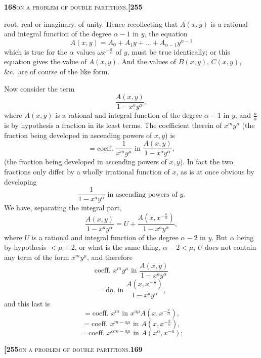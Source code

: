 \documentclass[11pt]{article}
\begin{document}
\newpage

\noindent\textbf{168}\hfill\textsc{on a problem of double partitions.}\hfill\textbf{[255}

\medskip

\noindent root, real or imaginary, of unity. Hence recollecting that $A(x, y)$ is a rational and integral function of the degree $\alpha - 1$ in $y$, the equation
\[
A(x, y) = A_0 + A_1 y + \ldots + A_{\alpha-1} y^{\alpha - 1}
\]
which is true for the $\alpha$ values $\omega x^{-\frac{a}{\alpha}}$ of $y$, must be true identically; or this equation gives the value of $A(x, y)$. And the values of $B(x, y)$, $C(x, y)$, \&c.\ are of course of the like form.

Now consider the term
\[
\frac{A(x, y)}{1 - x^a y^{\alpha}},
\]
where $A(x, y)$ is a rational and integral function of the degree $\alpha - 1$ in $y$, and $\tfrac{a}{\alpha}$ is by hypothesis a fraction in its least terms. The coefficient therein of $x^m y^{\mu}$ (the fraction being developed in ascending powers of $x, y$) is
\[
= \text{coeff.\ } \frac{1}{x^m y^{\mu}} \text{ in } \frac{A(x, y)}{1 - x^a y^{\alpha}},
\]
(the fraction being developed in ascending powers of $x, y$). In fact the two fractions only differ by a wholly irrational function of $x$, as is at once obvious by developing
\[
\frac{1}{1 - x^a y^{\alpha}} \text{ in ascending powers of } y.
\]
We have, separating the integral part,
\[
\frac{A(x, y)}{1 - x^a y^{\alpha}} = U + \frac{A(x, x^{-\frac{a}{\alpha}})}{1 - x^a y^{\alpha}},
\]
where $U$ is a rational and integral function of the degree $\alpha - 2$ in $y$. But $\alpha$ being by hypothesis $< \mu + 2$, or what is the same thing, $\alpha - 2 < \mu$, $U$ does not contain any term of the form $x^m y^{\mu}$, and therefore
\[
\text{coeff.\ } x^m y^{\mu} \text{ in } \frac{A(x, y)}{1 - x^a y^{\alpha}}
\]
\[
= \text{do.\ in } \frac{A(x, x^{-\frac{a}{\alpha}})}{1 - x^a y^{\alpha}},
\]
and this last is
\[
= \text{coeff.\ } x^m \text{ in } x^{a\mu} A(x, x^{-\frac{a}{\alpha}}),
\]
\[
= \text{coeff.\ } x^{m - a\mu} \text{ in } A(x, x^{-\frac{a}{\alpha}}),
\]
\[
= \text{coeff.\ } x^{\alpha m - a\mu} \text{ in } A(x^{\alpha}, x^{-a});
\]

\newpage

\noindent\textbf{[255}\hfill\textsc{on a problem of double partitions.}\hfill\textbf{169}

\medskip
\end{document}
